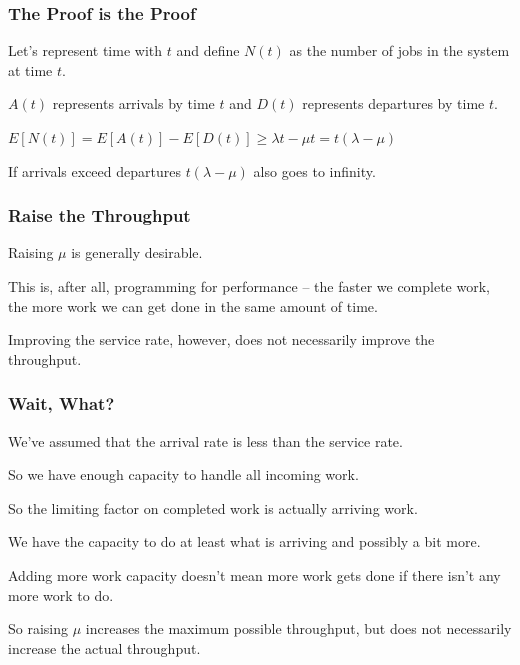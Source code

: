 \begin{frame}
\frametitle{The Proof is the Proof}

Let's represent time with $t$ and define $N(t)$ as the number of jobs in the system at time $t$.

$A(t)$ represents arrivals by time $t$ and $D(t)$ represents departures by time $t$.

\begin{center}
	$E[N(t)] = E[A(t)] - E[D(t)] \geq \lambda t - \mu t = t (\lambda - \mu) $
\end{center}

If arrivals exceed departures $t (\lambda - \mu) $ also goes to infinity.

\end{frame}



\begin{frame}
\frametitle{Raise the Throughput}

Raising $\mu$ is generally desirable. 

This is, after all, programming for performance -- the faster we complete work, the more work we can get done in the same amount of time. 

Improving the service rate, however, does not necessarily improve the throughput. 

\end{frame}



\begin{frame}
\frametitle{Wait, What?}

We've assumed that the arrival rate is less than the service rate. 

So we have enough capacity to handle all incoming work. 

So the limiting factor on completed work is actually arriving work. 

We have the capacity to do at least what is arriving and possibly a bit more. 

Adding more work capacity doesn't mean more work gets done if there isn't any more work to do.

So raising $\mu$ increases the maximum possible throughput, but does not necessarily increase the actual throughput.

\end{frame}



